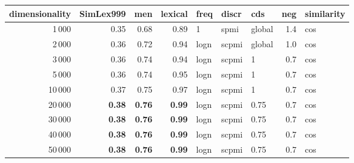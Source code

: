 \begin{tabular}{rrrrlllrl}
\toprule
 dimensionality &  SimLex999 &   men &  lexical &  freq &  discr &     cds &  neg & similarity \\
\midrule
           1\,000 &       0.35 &  0.68 &     0.89 &     1 &   spmi &  global &  1.4 &        cos \\
           2\,000 &       0.36 &  0.72 &     0.94 &  logn &  scpmi &  global &  1.0 &        cos \\
           3\,000 &       0.36 &  0.74 &     0.94 &  logn &  scpmi &       1 &  0.7 &        cos \\
           5\,000 &       0.36 &  0.74 &     0.95 &  logn &  scpmi &       1 &  0.7 &        cos \\
          10\,000 &       0.37 &  0.75 &     0.97 &  logn &  scpmi &       1 &  0.7 &        cos \\
          20\,000 &       \textbf{0.38} &  \textbf{0.76} &     \textbf{0.99} &  logn &  scpmi &    0.75 &  0.7 &        cos \\
          30\,000 &       \textbf{0.38} &  \textbf{0.76} &     \textbf{0.99} &  logn &  scpmi &    0.75 &  0.7 &        cos \\
          40\,000 &       \textbf{0.38} &  \textbf{0.76} &     \textbf{0.99} &  logn &  scpmi &    0.75 &  0.7 &        cos \\
          50\,000 &       \textbf{0.38} &  \textbf{0.76} &     \textbf{0.99} &  logn &  scpmi &    0.75 &  0.7 &        cos \\
\bottomrule
\end{tabular}
